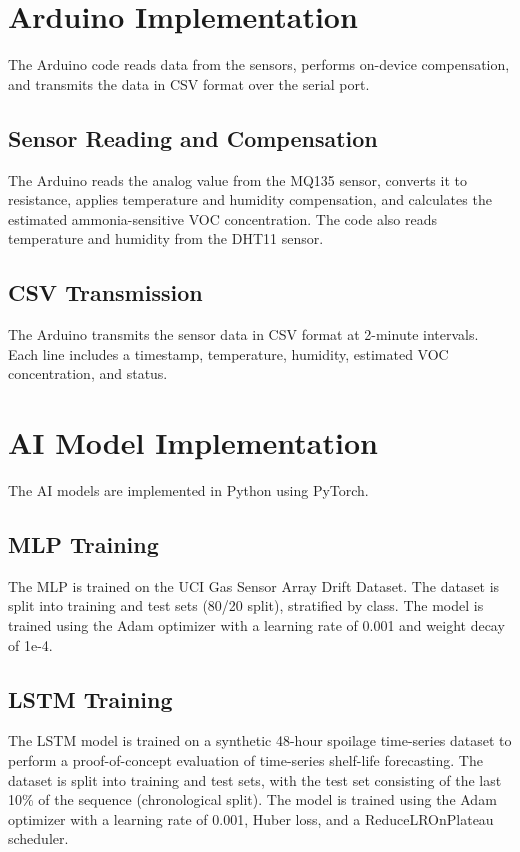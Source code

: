 \section{Arduino Implementation}
The Arduino code reads data from the sensors, performs on-device compensation, and transmits the data in CSV format over the serial port.

\subsection{Sensor Reading and Compensation}
The Arduino reads the analog value from the MQ135 sensor, converts it to resistance, applies temperature and humidity compensation, and calculates the estimated ammonia-sensitive VOC concentration. The code also reads temperature and humidity from the DHT11 sensor.

\subsection{CSV Transmission}
The Arduino transmits the sensor data in CSV format at 2-minute intervals. Each line includes a timestamp, temperature, humidity, estimated VOC concentration, and status.

\section{AI Model Implementation}
The AI models are implemented in Python using PyTorch.

\subsection{MLP Training}
The MLP is trained on the UCI Gas Sensor Array Drift Dataset. The dataset is split into training and test sets (80/20 split), stratified by class. The model is trained using the Adam optimizer with a learning rate of 0.001 and weight decay of 1e-4.

\subsection{LSTM Training}
The LSTM model is trained on a synthetic 48-hour spoilage time-series dataset to perform a proof-of-concept evaluation of time-series shelf-life forecasting. The dataset is split into training and test sets, with the test set consisting of the last 10\% of the sequence (chronological split). The model is trained using the Adam optimizer with a learning rate of 0.001, Huber loss, and a ReduceLROnPlateau scheduler.

